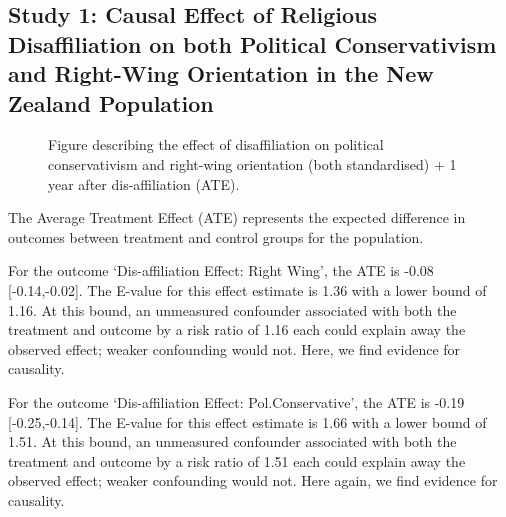 \documentclass[
  singlecolumn]{article}
\begin{document}
\newpage{}

\subsection{Study 1: Causal Effect of Religious Disaffiliation on both
Political Conservativism and Right-Wing Orientation in the New Zealand
Population}\label{study-1-causal-effect-of-religious-disaffiliation-on-both-political-conservativism-and-right-wing-orientation-in-the-new-zealand-population}

\begin{figure}


\caption{\label{fig-ate}Figure describing the effect of disaffiliation
on political conservativism and right-wing orientation (both
standardised) + 1 year after dis-affiliation (ATE).}

\end{figure}%

\begin{table}

\caption{\label{tbl-ate}}

\centering{

\captionsetup{labelsep=none}

}

\end{table}%

The Average Treatment Effect (ATE) represents the expected difference in
outcomes between treatment and control groups for the population.

For the outcome `Dis-affiliation Effect: Right Wing', the ATE is -0.08
{[}-0.14,-0.02{]}. The E-value for this effect estimate is 1.36 with a
lower bound of 1.16. At this bound, an unmeasured confounder associated
with both the treatment and outcome by a risk ratio of 1.16 each could
explain away the observed effect; weaker confounding would not. Here, we
find evidence for causality.

For the outcome `Dis-affiliation Effect: Pol.Conservative', the ATE is
-0.19 {[}-0.25,-0.14{]}. The E-value for this effect estimate is 1.66
with a lower bound of 1.51. At this bound, an unmeasured confounder
associated with both the treatment and outcome by a risk ratio of 1.51
each could explain away the observed effect; weaker confounding would
not. Here again, we find evidence for causality.
\end{document}
